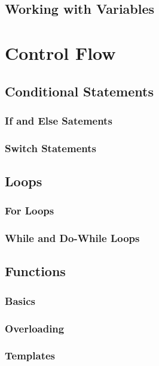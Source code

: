 \documentclass[11pt,fancy,authoryear]{elegantbook}
\begin{document}
\section{Working with Variables}

\chapter{Control Flow}

\section{Conditional Statements}

\subsection{If and Else Satements}

\subsection{Switch Statements}

\section{Loops}

\subsection{For Loops}

\subsection{While and Do-While Loops}

\section{Functions}

\subsection{Basics}

\subsection{Overloading}

\subsection{Templates}
\end{document}
